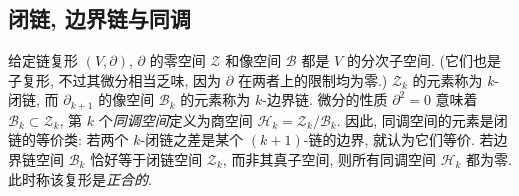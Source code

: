 \subsection{{闭链, 边界链与同调}}\label{sec:cycles-boundaries-homology}

{给定链复形 $(V,\partial)$, $\partial$ 的零空间 $\mathcal Z$ 和像空间 $\mathcal B$ 都是 $V$ 的分次子空间. (它们也是子复形, 不过其微分相当乏味, 因为 $\partial$ 在两者上的限制均为零.) $\mathcal Z_k$ 的元素称为 $k$-闭链, 而 $\partial_{k+1}$ 的像空间 $\mathcal B_k$ 的元素称为 $k$-边界链. 微分的性质 $\partial^2=0$ 意味着 $\mathcal B_k\subset\mathcal Z_k$, 第 $k$ 个\emph{同调空间}定义为商空间 $\mathcal H_k=\mathcal Z_k/\mathcal B_k$. 因此, 同调空间的元素是闭链的等价类: 若两个 $k$-闭链之差是某个 $(k+1)$-链的边界, 就认为它们等价. 若边界链空间 $\mathcal B_k$ 恰好等于闭链空间 $\mathcal Z_k$, 而非其真子空间, 则所有同调空间 $\mathcal H_k$ 都为零. 此时称该复形是\emph{正合的}.}
